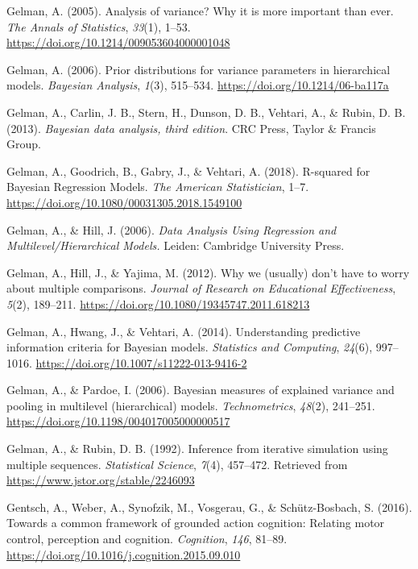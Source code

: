 \documentclass[a4paper,12pt,twoside,onecolumn,openright,final,oldfontcommands]{memoir}
\begin{document}
\leavevmode\hypertarget{ref-gelman_analysis_2005}{}%
Gelman, A. (2005). Analysis of variance? Why it is more important than ever. \emph{The Annals of Statistics}, \emph{33}(1), 1--53. \url{https://doi.org/10.1214/009053604000001048}

\leavevmode\hypertarget{ref-gelman_prior_2006}{}%
Gelman, A. (2006). Prior distributions for variance parameters in hierarchical models. \emph{Bayesian Analysis}, \emph{1}(3), 515--534. \url{https://doi.org/10.1214/06-ba117a}

\leavevmode\hypertarget{ref-gelman_bayesian_2013}{}%
Gelman, A., Carlin, J. B., Stern, H., Dunson, D. B., Vehtari, A., \& Rubin, D. B. (2013). \emph{Bayesian data analysis, third edition}. CRC Press, Taylor \& Francis Group.

\leavevmode\hypertarget{ref-gelman_r-squared_2018}{}%
Gelman, A., Goodrich, B., Gabry, J., \& Vehtari, A. (2018). R-squared for Bayesian Regression Models. \emph{The American Statistician}, 1--7. \url{https://doi.org/10.1080/00031305.2018.1549100}

\leavevmode\hypertarget{ref-gelman_data_2006}{}%
Gelman, A., \& Hill, J. (2006). \emph{Data Analysis Using Regression and Multilevel/Hierarchical Models.} Leiden: Cambridge University Press.

\leavevmode\hypertarget{ref-gelman_why_2012}{}%
Gelman, A., Hill, J., \& Yajima, M. (2012). Why we (usually) don't have to worry about multiple comparisons. \emph{Journal of Research on Educational Effectiveness}, \emph{5}(2), 189--211. \url{https://doi.org/10.1080/19345747.2011.618213}

\leavevmode\hypertarget{ref-gelman_understanding_2014}{}%
Gelman, A., Hwang, J., \& Vehtari, A. (2014). Understanding predictive information criteria for Bayesian models. \emph{Statistics and Computing}, \emph{24}(6), 997--1016. \url{https://doi.org/10.1007/s11222-013-9416-2}

\leavevmode\hypertarget{ref-gelman_bayesian_2006}{}%
Gelman, A., \& Pardoe, I. (2006). Bayesian measures of explained variance and pooling in multilevel (hierarchical) models. \emph{Technometrics}, \emph{48}(2), 241--251. \url{https://doi.org/10.1198/004017005000000517}

\leavevmode\hypertarget{ref-gelman_inference_1992}{}%
Gelman, A., \& Rubin, D. B. (1992). Inference from iterative simulation using multiple sequences. \emph{Statistical Science}, \emph{7}(4), 457--472. Retrieved from \url{https://www.jstor.org/stable/2246093}

\leavevmode\hypertarget{ref-gentsch_towards_2016}{}%
Gentsch, A., Weber, A., Synofzik, M., Vosgerau, G., \& Schütz-Bosbach, S. (2016). Towards a common framework of grounded action cognition: Relating motor control, perception and cognition. \emph{Cognition}, \emph{146}, 81--89. \url{https://doi.org/10.1016/j.cognition.2015.09.010}
\end{document}
